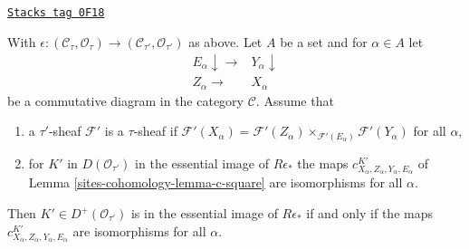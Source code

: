 \begin{lemma}
\label{sites-cohomology-lemma-descent-squares}
\href{https://stacks.math.columbia.edu/tag/0F18}{\texttt{Stacks tag 0F18}}

With $\epsilon : (\mathcal{C}_\tau, \mathcal{O}_\tau) \to
(\mathcal{C}_{\tau'}, \mathcal{O}_{\tau'})$ as above.
Let $A$ be a set and for $\alpha \in A$ let
$$
\begin{array}{cc}E_\alpha \downarrow\longrightarrow & Y_\alpha \downarrow \\ Z_\alpha \longrightarrow & X_\alpha\end{array}
$$
be a commutative diagram in the category $\mathcal{C}$. Assume that
\begin{enumerate}
\item a $\tau'$-sheaf $\mathcal{F}'$ is a $\tau$-sheaf if
$\mathcal{F}'(X_\alpha) =
\mathcal{F}'(Z_\alpha) \times_{\mathcal{F}'(E_\alpha)}
\mathcal{F}'(Y_\alpha)$ for all $\alpha$,
\item for $K'$ in $D(\mathcal{O}_{\tau'})$ in the essential image
of $R\epsilon_*$ the maps $c^{K'}_{X_\alpha, Z_\alpha, Y_\alpha, E_\alpha}$
of Lemma \ref{sites-cohomology-lemma-c-square}
are isomorphisms for all $\alpha$.
\end{enumerate}
Then $K' \in D^+(\mathcal{O}_{\tau'})$ is in
the essential image of $R\epsilon_*$ if and only if
the maps $c^{K'}_{X_\alpha, Z_\alpha, Y_\alpha, E_\alpha}$
are isomorphisms for all $\alpha$.
\end{lemma}

